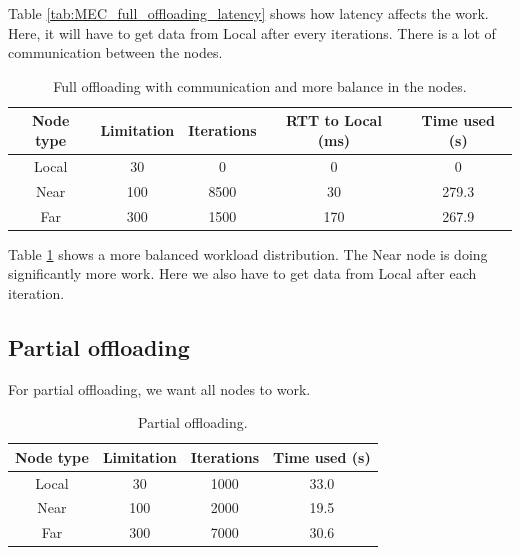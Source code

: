 Table \ref{tab:MEC_full_offloading_latency} shows how latency affects the work. Here, it will have to get data from Local after every iterations. There is a lot of communication between the nodes.

\begin{table}[h!]
    \centering
    \begin{tabular}[c]{|c|c|c|c|c|}
        \hline
        Node type & Limitation & Iterations & RTT to Local (ms)& Time used (s)\\
        \hline
        \hline
        Local & 30 & 0 & 0 & 0 \\
        \hline
        Near & 100 & 8500 & 30 & 279.3 \\
        \hline
        Far & 300 & 1500 & 170 & 267.9 \\
        \hline
    \end{tabular}
    \caption{Full offloading with communication and more balance in the nodes.}
    \label{tab:MEC_full_offloading_latency_balance}
\end{table}

Table \ref{tab:MEC_full_offloading_latency_balance} shows a more balanced workload distribution. The Near node is doing significantly more work. Here we also have to get data from Local after each iteration.














\subsection{Partial offloading}
For partial offloading, we want all nodes to work.
\begin{table}[h!]
    \centering
    \begin{tabular}[c]{|c|c|c|c|}
        \hline
        Node type & Limitation & Iterations & Time used (s)\\
        \hline
        \hline
        Local & 30 & 1000 & 33.0 \\
        \hline
        Near & 100 & 2000 & 19.5 \\
        \hline
        Far & 300 & 7000 & 30.6 \\
        \hline
    \end{tabular}
    \caption{Partial offloading.}
    \label{tab:MEC_partial_offloading}
\end{table}


